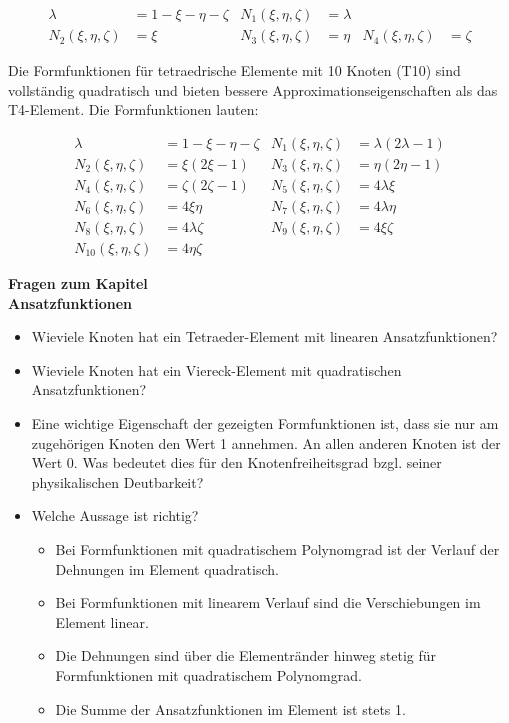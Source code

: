 \begin{align}
\lambda &= 1 - \xi - \eta - \zeta & N_1(\xi ,\eta ,\zeta ) &= \lambda \\
N_2(\xi ,\eta ,\zeta ) &= \xi & N_3(\xi ,\eta ,\zeta ) &= \eta & N_4(\xi ,\eta ,\zeta ) &= \zeta
\end{align}

Die Formfunktionen für tetraedrische Elemente mit 10 Knoten (T10) sind vollständig quadratisch und bieten bessere Approximationseigenschaften als das T4-Element. Die Formfunktionen lauten:

\begin{align}
\lambda &= 1 - \xi - \eta - \zeta & N_1(\xi ,\eta ,\zeta ) &= \lambda (2\lambda - 1) \\
N_2(\xi ,\eta ,\zeta ) &= \xi (2\xi - 1) & N_3(\xi ,\eta ,\zeta ) &= \eta (2\eta - 1) \\
N_4(\xi ,\eta ,\zeta ) &= \zeta (2\zeta - 1) & N_5(\xi ,\eta ,\zeta ) &= 4\lambda \xi \\
N_6(\xi ,\eta ,\zeta ) &= 4\xi \eta & N_7(\xi ,\eta ,\zeta ) &= 4\lambda \eta \\
N_8(\xi ,\eta ,\zeta ) &= 4\lambda \zeta & N_9(\xi ,\eta ,\zeta ) &= 4\xi \zeta \\
N_{10}(\xi ,\eta ,\zeta ) &= 4\eta \zeta
\end{align}

\begin{framed}
\textbf{Fragen zum Kapitel}\\
\textbf{Ansatzfunktionen}

\begin{itemize}
\item Wieviele Knoten hat ein Tetraeder-Element mit linearen Ansatzfunktionen?
\item Wieviele Knoten hat ein Viereck-Element mit quadratischen Ansatzfunktionen?
\item Eine wichtige Eigenschaft der gezeigten Formfunktionen ist, dass sie nur am zugehörigen Knoten den Wert 1 annehmen. An allen anderen Knoten ist der Wert 0. Was bedeutet dies für den Knotenfreiheitsgrad bzgl. seiner physikalischen Deutbarkeit?
\item Welche Aussage ist richtig?\begin{itemize}
\item Bei Formfunktionen mit quadratischem Polynomgrad ist der Verlauf der Dehnungen im Element quadratisch.
\item Bei Formfunktionen mit linearem Verlauf sind die Verschiebungen im Element linear.
\item Die Dehnungen sind über die Elementränder hinweg stetig für Formfunktionen mit quadratischem Polynomgrad.
\item Die Summe der Ansatzfunktionen im Element ist stets 1.
\end{itemize}
\end{itemize}
\end{framed}